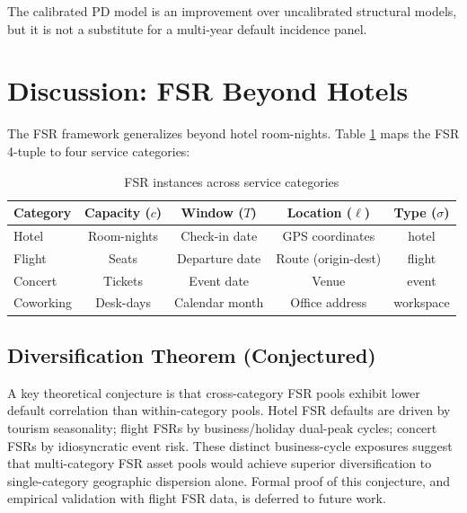 \documentclass[12pt,a4paper]{article}
\begin{document}
The calibrated PD model is an improvement over uncalibrated structural models, but it is not a substitute for a multi-year default incidence panel.

\section{Discussion: FSR Beyond Hotels}

The FSR framework generalizes beyond hotel room-nights.
Table \ref{tab:fsr-instances} maps the FSR 4-tuple to four service categories:

\begin{table}[H]
\centering
\caption{FSR instances across service categories}
\label{tab:fsr-instances}
\begin{tabular}{@{}lcccc@{}}
\toprule
\textbf{Category} & \textbf{Capacity ($c$)} & \textbf{Window ($T$)} & \textbf{Location ($\ell$)} & \textbf{Type ($\sigma$)} \\
\midrule
Hotel       & Room-nights       & Check-in date      & GPS coordinates    & hotel \\
Flight      & Seats             & Departure date     & Route (origin-dest)& flight \\
Concert     & Tickets           & Event date         & Venue              & event \\
Coworking   & Desk-days         & Calendar month     & Office address     & workspace \\
\bottomrule
\end{tabular}
\end{table}

\subsection{Diversification Theorem (Conjectured)}

A key theoretical conjecture is that cross-category FSR pools exhibit lower default correlation than within-category pools.
Hotel FSR defaults are driven by tourism seasonality; flight FSRs by business/holiday dual-peak cycles; concert FSRs by idiosyncratic event risk.
These distinct business-cycle exposures suggest that multi-category FSR asset pools would achieve superior diversification to single-category geographic dispersion alone.
Formal proof of this conjecture, and empirical validation with flight FSR data, is deferred to future work.
\end{document}
